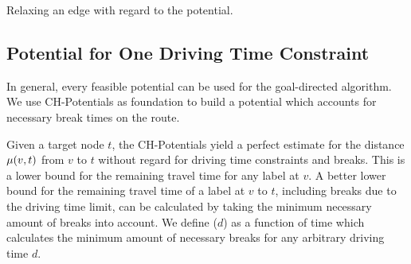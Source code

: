 \begin{algorithm}[hbtp]
	\DontPrintSemicolon



	\caption[\textsc{RelaxEdge} with potential]{\label{alg:relax_edge_a_star} Relaxing an edge with regard to the potential.}
\end{algorithm}

\subsection{Potential for One Driving Time Constraint}\label{section:potential_csp}
In general, every feasible potential can be used for the goal-directed algorithm. We use CH-Potentials as foundation to build a potential which accounts for necessary break times on the route.

Given a target node $t$, the CH-Potentials yield a perfect estimate for the distance $\mu(v,t)$ from $v$ to $t$ without regard for driving time constraints and breaks. This is a lower bound for the remaining travel time for any label at $v$. A better lower bound for the remaining travel time of a label at $v$ to $t$, including breaks due to the driving time limit, can be calculated by taking the minimum necessary amount of breaks into account. We define \minBreaks($d$) as a function of time which calculates the minimum amount of necessary breaks for any arbitrary driving time $d$.

